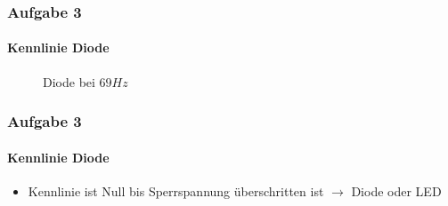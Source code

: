 \begin{frame}
\frametitle{Aufgabe 3}
\framesubtitle{Kennlinie Diode}
    \begin{figure}[H]
    \caption{Diode bei $69Hz$}
    \begin{center}
    \end{center}
    \end{figure}
\end{frame}
\begin{frame}
\frametitle{Aufgabe 3}
\framesubtitle{Kennlinie Diode}
    \begin{itemize}
        \item Kennlinie ist Null bis Sperrspannung überschritten ist
        $\rightarrow$ Diode oder LED
    \end{itemize}
\end{frame}
